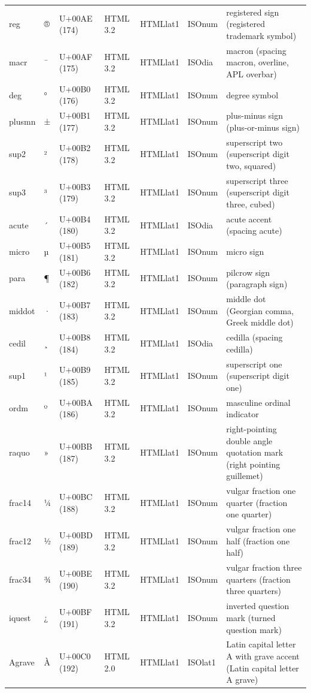 \documentclass{article}
\begin{document}
\begin{tabular}{lllllll}
reg & ® & U+00AE (174) & HTML 3.2 & HTMLlat1 & ISOnum & registered sign (registered trademark symbol) \\
macr & ¯ & U+00AF (175) & HTML 3.2 & HTMLlat1 & ISOdia & macron (spacing macron, overline, APL overbar) \\
deg & ° & U+00B0 (176) & HTML 3.2 & HTMLlat1 & ISOnum & degree symbol \\
plusmn & ± & U+00B1 (177) & HTML 3.2 & HTMLlat1 & ISOnum & plus-minus sign (plus-or-minus sign) \\
sup2 & ² & U+00B2 (178) & HTML 3.2 & HTMLlat1 & ISOnum & superscript two (superscript digit two, squared) \\
sup3 & ³ & U+00B3 (179) & HTML 3.2 & HTMLlat1 & ISOnum & superscript three (superscript digit three, cubed) \\
acute & ´ & U+00B4 (180) & HTML 3.2 & HTMLlat1 & ISOdia & acute accent (spacing acute) \\
micro & µ & U+00B5 (181) & HTML 3.2 & HTMLlat1 & ISOnum & micro sign \\
para & ¶ & U+00B6 (182) & HTML 3.2 & HTMLlat1 & ISOnum & pilcrow sign (paragraph sign) \\
middot & · & U+00B7 (183) & HTML 3.2 & HTMLlat1 & ISOnum & middle dot (Georgian comma, Greek middle dot) \\
cedil & ¸ & U+00B8 (184) & HTML 3.2 & HTMLlat1 & ISOdia & cedilla (spacing cedilla) \\
sup1 & ¹ & U+00B9 (185) & HTML 3.2 & HTMLlat1 & ISOnum & superscript one (superscript digit one) \\
ordm & º & U+00BA (186) & HTML 3.2 & HTMLlat1 & ISOnum & masculine ordinal indicator \\
raquo & » & U+00BB (187) & HTML 3.2 & HTMLlat1 & ISOnum & right-pointing double angle quotation mark (right pointing guillemet) \\
frac14 & ¼ & U+00BC (188) & HTML 3.2 & HTMLlat1 & ISOnum & vulgar fraction one quarter (fraction one quarter) \\
frac12 & ½ & U+00BD (189) & HTML 3.2 & HTMLlat1 & ISOnum & vulgar fraction one half (fraction one half) \\
frac34 & ¾ & U+00BE (190) & HTML 3.2 & HTMLlat1 & ISOnum & vulgar fraction three quarters (fraction three quarters) \\
iquest & ¿ & U+00BF (191) & HTML 3.2 & HTMLlat1 & ISOnum & inverted question mark (turned question mark) \\
Agrave & À & U+00C0 (192) & HTML 2.0 & HTMLlat1 & ISOlat1 & Latin capital letter A with grave accent (Latin capital letter A grave) \\

\end{tabular}
\end{document}
